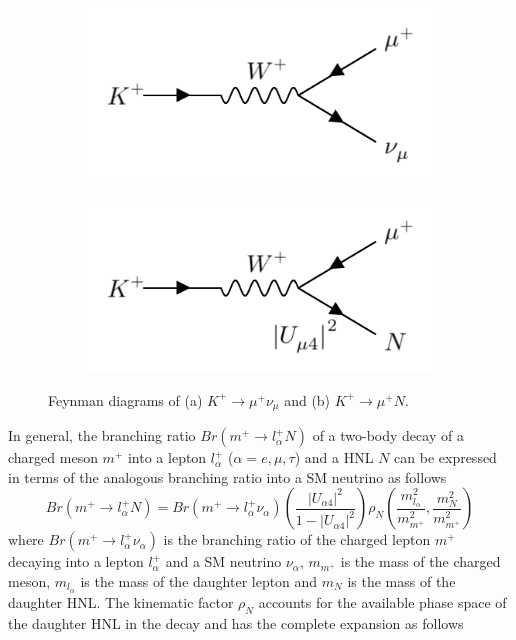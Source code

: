 \begin{figure}[ht!]
\begin{subfigure}[h]{0.4\linewidth}
\centering    
\includegraphics[width=\linewidth]{K_to_nu}
\caption{}
\label{fig:kaonnu}
\end{subfigure}
\hfill
\begin{subfigure}[h]{0.4\linewidth}
\centering    
\includegraphics[width=\linewidth]{K_to_HNL}
\caption{}
\label{fig:kaonhnl}
\end{subfigure}%
\caption[kaonDiagram]{
	Feynman diagrams of (a) $K^+ \rightarrow \mu^+ \nu_{\mu}$ and (b) $K^+ \rightarrow \mu^+ N$.%
}
\end{figure}

In general, the branching ratio $Br(m^+\rightarrow l^{+}_{\alpha}N)$ of a two-body decay of a charged meson $m^+$ into a lepton $l^{+}_{\alpha}$ ($\alpha=e,\mu,\tau$) and a HNL $N$ can be expressed in terms of the analogous branching ratio into a SM neutrino as follows \cite{HNLKelly}
\begin{equation}
	\label{eq:kaon_decay_hnl}
	Br(m^+\rightarrow l^{+}_{\alpha}N) = Br(m^+\rightarrow l^{+}_{\alpha}\nu_{\alpha})\left(\frac{|U_{\alpha 4}|^{2}}{1 - |U_{\alpha 4}|^{2}}\right)\rho_{N}\left(\frac{m^{2}_{l_{\alpha}}}{m^{2}_{m^+}}, \frac{m^{2}_{N}}{m^{2}_{m^+}} \right) 
\end{equation}
where $Br(m^+\rightarrow l^{+}_{\alpha}\nu_{\alpha})$ is the branching ratio of the charged lepton $m^+$ decaying into a lepton $l^+_{\alpha}$ and a SM neutrino $\nu_{\alpha}$, $m_{m^+}$ is the mass of the charged meson, $m_{l_{\alpha}}$ is the mass of the daughter lepton and $m_{N}$ is the mass of the daughter HNL.
The kinematic factor $\rho_{N}$ accounts for the available phase space of the daughter HNL in the decay and has the complete expansion as follows \cite{HNLKelly}

